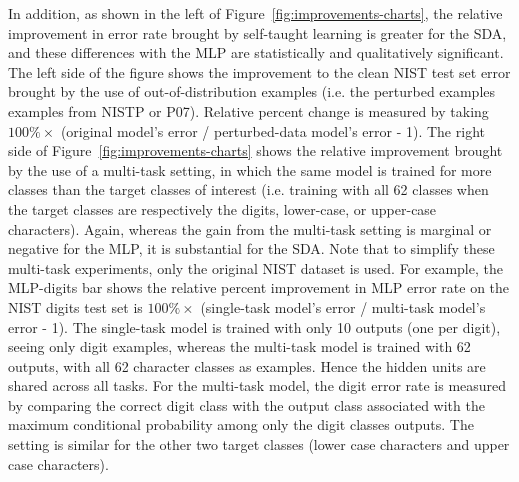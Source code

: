\documentclass{article} %
\begin{document}
In addition, as shown in the left of
Figure~\ref{fig:improvements-charts}, the relative improvement in error
rate brought by self-taught learning is greater for the SDA, and these
differences with the MLP are statistically and qualitatively
significant. 
The left side of the figure shows the improvement to the clean
NIST test set error brought by the use of out-of-distribution examples
(i.e. the perturbed examples examples from NISTP or P07). 
Relative percent change is measured by taking
$100 \% \times$ (original model's error / perturbed-data model's error - 1).
The right side of
Figure~\ref{fig:improvements-charts} shows the relative improvement
brought by the use of a multi-task setting, in which the same model is
trained for more classes than the target classes of interest (i.e. training
with all 62 classes when the target classes are respectively the digits,
lower-case, or upper-case characters). Again, whereas the gain from the
multi-task setting is marginal or negative for the MLP, it is substantial
for the SDA.  Note that to simplify these multi-task experiments, only the original
NIST dataset is used. For example, the MLP-digits bar shows the relative
percent improvement in MLP error rate on the NIST digits test set 
is $100\% \times$ (single-task
model's error / multi-task model's error - 1).  The single-task model is
trained with only 10 outputs (one per digit), seeing only digit examples,
whereas the multi-task model is trained with 62 outputs, with all 62
character classes as examples.  Hence the hidden units are shared across
all tasks.  For the multi-task model, the digit error rate is measured by
comparing the correct digit class with the output class associated with the
maximum conditional probability among only the digit classes outputs.  The
setting is similar for the other two target classes (lower case characters
and upper case characters).

\end{document}
